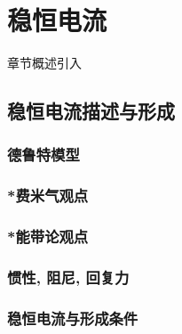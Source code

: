 \chapter{稳恒电流}\label{17}

章节概述引入

\section{稳恒电流描述与形成}\label{17-1}

\subsection{德鲁特模型}\label{17-1-1}

\subsection{*费米气观点}\label{17-1-2}

\subsection{*能带论观点}\label{17-1-3}

\subsection{惯性, 阻尼, 回复力}\label{17-1-4}

\subsection{稳恒电流与形成条件}\label{17-1-5}